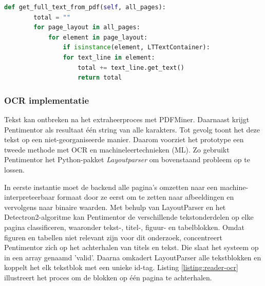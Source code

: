 \begin{lstlisting}[language=Python, caption={Een PDF inlezen met PDFMiner}, label={code:inlezen-van-pdf}]
	def get_full_text_from_pdf(self, all_pages):
		total = ""
		for page_layout in all_pages:
			for element in page_layout:
				if isinstance(element, LTTextContainer):
				for text_line in element:
					total += text_line.get_text()
					return total
\end{lstlisting}

\subsubsection{OCR implementatie}

Tekst kan ontbreken na het extraheerproces met PDFMiner. Daarnaast krijgt Pentimentor als resultaat één string van alle karakters. Tot gevolg toont het deze tekst op een niet-georganiseerde manier. Daarom voorziet het prototype een tweede methode met OCR en machineleertechnieken (ML). Zo gebruikt Pentimentor het Python-pakket \textit{Layoutparser} om bovenstaand probleem op te lossen.

\medspace

In eerste instantie moet de backend alle pagina's omzetten naar een machine-interpreteerbaar formaat door ze eerst om te zetten naar afbeeldingen en vervolgens naar binaire waarden. Met behulp van LayoutParser en het Detectron2-algoritme kan Pentimentor de verschillende tekstonderdelen op elke pagina classificeren, waaronder tekst-, titel-, figuur- en tabelblokken. Omdat figuren en tabellen niet relevant zijn voor dit onderzoek, concentreert Pentimentor zich op het achterhalen van titels en tekst. Die slaat het systeem op in een array genaamd 'valid'. Daarna omkadert LayoutParser alle tekstblokken en koppelt het elk tekstblok met een unieke id-tag. Listing \ref{listing:reader-ocr} illustreert het proces om de blokken op één pagina te achterhalen.

